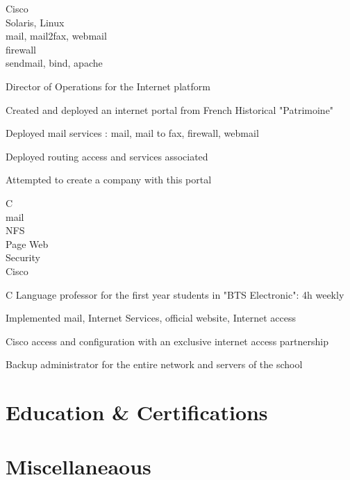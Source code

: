 \documentclass[a4paper,11pt]{cv4tw}%
\begin{document}
	{Cisco\\Solaris, Linux\\mail, mail2fax, webmail\\firewall\\sendmail, bind, apache}
		{
		\begin{missions}
			\item Director of Operations for the Internet platform
			\item Created and deployed an internet portal from French Historical "Patrimoine"
			\item Deployed mail services : mail, mail to fax, firewall, webmail
			\item Deployed routing access and services associated
			\item Attempted to create a company with this portal
		\end{missions}
	}

	{C\\mail\\NFS\\Page Web\\Security\\Cisco}
		{
		\begin{missions}
			\item C Language professor for the first year students in "BTS Electronic": 4h weekly
			\item Implemented mail, Internet Services, official website, Internet access
			\item Cisco access and configuration with an exclusive internet access partnership
			\item Backup administrator for the entire network and servers of the school
		\end{missions}
	}


	\section{Education \& Certifications}

	\section{Miscellaneaous}
	\begin{skills}{}
	\end{skills}
\end{document}
